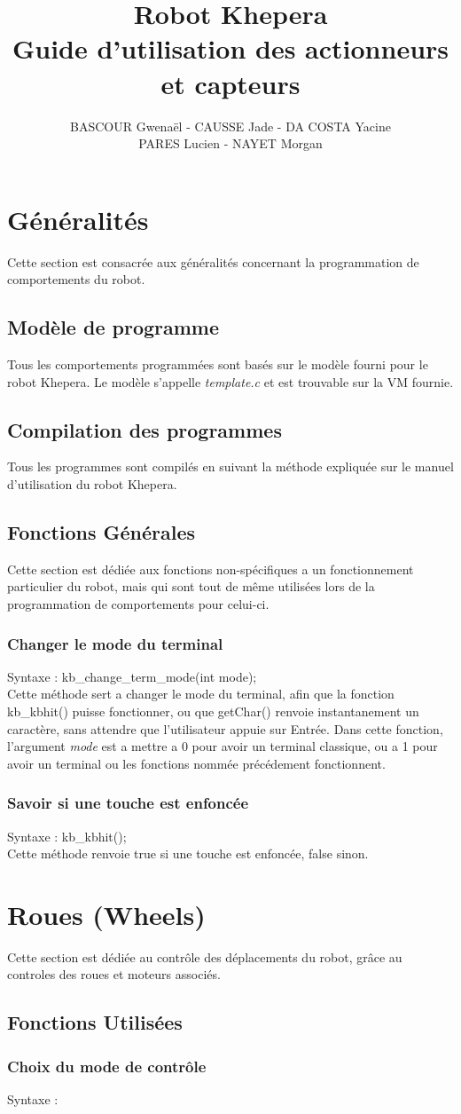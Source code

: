 \documentclass[english, 12pt]{article}
\author{BASCOUR Gwenaël - CAUSSE Jade -  DA COSTA Yacine\\PARES Lucien - NAYET Morgan}
\title{Robot Khepera \\ Guide d'utilisation des actionneurs et capteurs}
\begin{document}
	\maketitle
	\pagebreak
	\tableofcontents
	\pagebreak
	\section{Généralités}
		Cette section est consacrée aux généralités concernant la programmation de comportements du robot.
		\subsection{Modèle de programme}
			Tous les comportements programmées sont basés sur le modèle fourni pour le robot Khepera. Le modèle s'appelle \textit{template.c} et est trouvable sur la VM fournie.
		\subsection{Compilation des programmes}
			Tous les programmes sont compilés en suivant la méthode expliquée sur le manuel d'utilisation du robot Khepera.
		\subsection{Fonctions Générales}
			Cette section est dédiée aux fonctions non-spécifiques a un fonctionnement particulier du robot, mais qui sont tout de même utilisées lors de la programmation de comportements pour celui-ci.
			\subsubsection{Changer le mode du terminal}
				Syntaxe : kb\_change\_term\_mode(int mode);
				\\
				Cette méthode sert a changer le mode du terminal, afin que la fonction kb\_kbhit() puisse fonctionner, ou que getChar() renvoie instantanement un caractère, sans attendre que l'utilisateur appuie sur Entrée.
				Dans cette fonction, l'argument \textit{mode} est a mettre a 0 pour avoir un terminal classique, ou a 1 pour avoir un terminal ou les fonctions nommée précédement fonctionnent.
			\subsubsection{Savoir si une touche est enfoncée}
			Syntaxe : kb\_kbhit();
			\\
			Cette méthode renvoie true si une touche est enfoncée, false sinon.
	\section{Roues (Wheels)}
		Cette section est dédiée au contrôle des déplacements du robot, grâce au controles des roues et moteurs associés.
		\subsection{Fonctions Utilisées}
			\subsubsection{Choix du mode de contrôle}
			Syntaxe : 
		
		
\end{document}
